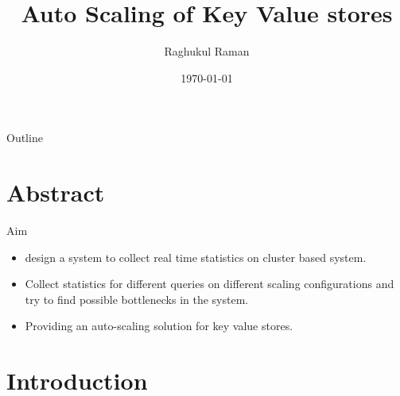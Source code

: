 \documentclass{beamer}
\title[CS396]{Auto Scaling of Key Value stores}
\author{Raghukul Raman}
\institute{IIT Kanpur}
\date{\today}
\begin{document}
\begin{frame}
  \titlepage
\end{frame}

\begin{frame}{Outline}
  \tableofcontents
\end{frame}

\section{Abstract}

\begin{frame}{Aim}
    \begin{itemize}
        \item design a system to collect real time statistics on cluster based system.
        \item Collect statistics for different queries on different scaling configurations
            and try to find possible bottlenecks in the system.
        \item Providing an auto-scaling solution for key
                value stores. 
    \end{itemize}
\end{frame}

\section{Introduction}
\end{document}
